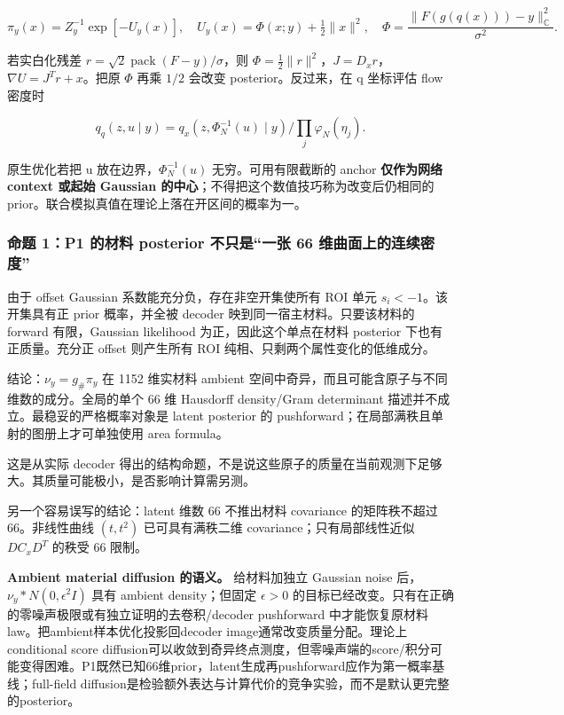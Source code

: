 \documentclass[
  11pt,
  a4paper,
]{article}
\begin{document}
\[
\pi_y(x)=Z_y^{-1}\exp[-U_y(x)],\quad U_y(x)=\Phi(x;y)+\tfrac12\|x\|^2,
\quad \Phi=\frac{\|F(g(q(x)))-y\|^2_{\mathbb{C}}}{\sigma^2}.
\]

若实白化残差 \(r=\sqrt2\operatorname{pack}(F-y)/\sigma\)，则
\(\Phi=\frac12\|r\|^2\)，\(J=D_xr\)，\(\nabla U=J^Tr+x\)。把原 \(\Phi\)
再乘 \(1/2\) 会改变 posterior。反过来，在 q 坐标评估 flow 密度时

\[
q_q(z,u\mid y)=q_x(z,\Phi_N^{-1}(u)\mid y)/\prod_j\varphi_N(\eta_j).
\]

原生优化若把 u 放在边界，\(\Phi_N^{-1}(u)\) 无穷。可用有限截断的 anchor
\textbf{仅作为网络 context 或起始 Gaussian
的中心}；不得把这个数值技巧称为改变后仍相同的
prior。联合模拟真值在理论上落在开区间的概率为一。

\hypertarget{ux547dux9898-1p1-ux7684ux6750ux6599-posterior-ux4e0dux53eaux662fux4e00ux5f20-66-ux7ef4ux66f2ux9762ux4e0aux7684ux8fdeux7eedux5bc6ux5ea6}{%
\subsubsection{命题 1：P1 的材料 posterior 不只是``一张 66
维曲面上的连续密度''}\label{ux547dux9898-1p1-ux7684ux6750ux6599-posterior-ux4e0dux53eaux662fux4e00ux5f20-66-ux7ef4ux66f2ux9762ux4e0aux7684ux8fdeux7eedux5bc6ux5ea6}}

由于 offset Gaussian 系数能充分负，存在非空开集使所有 ROI 单元
\(s_i<-1\)。该开集具有正 prior 概率，并全被 decoder
映到同一宿主材料。只要该材料的 forward 有限，Gaussian likelihood
为正，因此这个单点在材料 posterior 下也有正质量。充分正 offset
则产生所有 ROI 纯相、只剩两个属性变化的低维成分。

结论：\(\nu_y=g_\#\pi_y\) 在 1152 维实材料 ambient
空间中奇异，而且可能含原子与不同维数的成分。全局的单个 66 维 Hausdorff
density/Gram determinant 描述并不成立。最稳妥的严格概率对象是 latent
posterior 的 pushforward；在局部满秩且单射的图册上才可单独使用 area
formula。

这是从实际 decoder
得出的结构命题，不是说这些原子的质量在当前观测下足够大。其质量可能极小，是否影响计算需另测。

另一个容易误写的结论：latent 维数 66 不推出材料 covariance
的矩阵秩不超过 66。非线性曲线 \((t,t^2)\) 已可具有满秩二维
covariance；只有局部线性近似 \(D C_xD^T\) 的秩受 66 限制。

\textbf{Ambient material diffusion 的语义。} 给材料加独立 Gaussian noise
后，\(\nu_y*N(0,\epsilon^2I)\) 具有 ambient density；但固定
\(\epsilon>0\)
的目标已经改变。只有在正确的零噪声极限或有独立证明的去卷积/decoder
pushforward 中才能恢复原材料law。把ambient样本优化投影回decoder
image通常改变质量分配。理论上conditional score
diffusion可以收敛到奇异终点测度，但零噪声端的score/积分可能变得困难。P1既然已知66维prior，latent生成再pushforward应作为第一概率基线；full-field
diffusion是检验额外表达与计算代价的竞争实验，而不是默认更完整的posterior。
\end{document}
